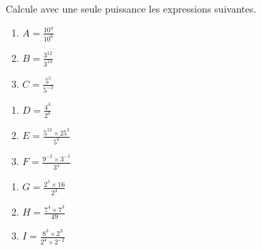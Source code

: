 
Calcule avec une seule puissance les expressions suivantes.

\begin{minipage}{0.3\linewidth}
\begin{enumerate}
\item $A= \frac{10^4}{10^6}$ 
\item $B= \frac{3^{12}}{3^{10}}$
\item $C= \frac{5^{5}}{5^{-3}}$
\end{enumerate}
\end{minipage}
\hfill
\begin{minipage}{0.3\linewidth}
\begin{enumerate}
\item $D= \frac{4^3}{2^8}$
\item $E= \frac{5^{12} \times 25^2}{5^8}$
\item $F= \frac{9^{-2} \times 3^{-5}}{3^4}$
\end{enumerate}
\end{minipage}
\hfill
\begin{minipage}{0.3\linewidth}
\begin{enumerate}
\item $G= \frac{2^5 \times 16}{2^3}$
\item $H= \frac{7^4 \times 7^3}{49}$
\item $I= \frac{8^{3} \times 2^{3}}{2^{4} \times 2^{-2}}$
\end{enumerate}
\end{minipage}